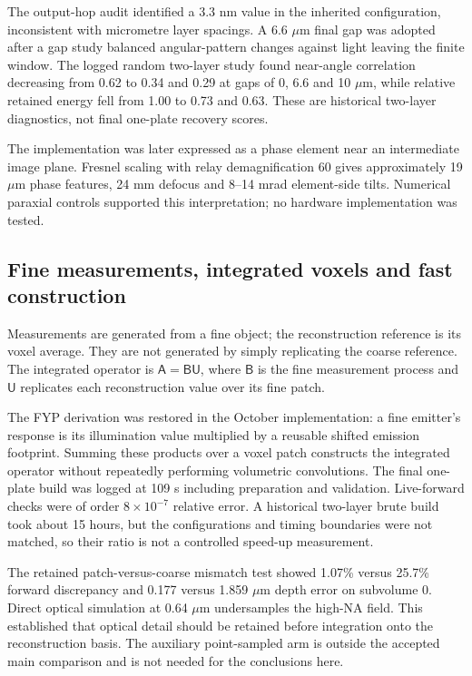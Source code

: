 The output-hop audit identified a 3.3 nm value in the inherited configuration, inconsistent with micrometre layer spacings. A 6.6 \ensuremath{\mu}m final gap was adopted after a gap study balanced angular-pattern changes against light leaving the finite window. The logged random two-layer study found near-angle correlation decreasing from 0.62 to 0.34 and 0.29 at gaps of 0, 6.6 and 10 \ensuremath{\mu}m, while relative retained energy fell from 1.00 to 0.73 and 0.63. These are historical two-layer diagnostics, not final one-plate recovery scores.

The implementation was later expressed as a phase element near an intermediate image plane. Fresnel scaling with relay demagnification 60 gives approximately 19 \ensuremath{\mu}m phase features, 24 mm defocus and 8--14 mrad element-side tilts. Numerical paraxial controls supported this interpretation; no hardware implementation was tested.

\subsection{Fine measurements, integrated voxels and fast construction}

Measurements are generated from a fine object; the reconstruction reference is its voxel average. They are not generated by simply replicating the coarse reference. The integrated operator is \(\mathsf A=\mathsf B\mathsf U\), where \(\mathsf B\) is the fine measurement process and \(\mathsf U\) replicates each reconstruction value over its fine patch.

The FYP derivation was restored in the October implementation: a fine emitter's response is its illumination value multiplied by a reusable shifted emission footprint. Summing these products over a voxel patch constructs the integrated operator without repeatedly performing volumetric convolutions. The final one-plate build was logged at 109 s including preparation and validation. Live-forward checks were of order \(8\times10^{-7}\) relative error. A historical two-layer brute build took about 15 hours, but the configurations and timing boundaries were not matched, so their ratio is not a controlled speed-up measurement.

The retained patch-versus-coarse mismatch test showed 1.07\% versus 25.7\% forward discrepancy and 0.177 versus 1.859 \ensuremath{\mu}m depth error on subvolume 0. Direct optical simulation at 0.64 \ensuremath{\mu}m undersamples the high-NA field. This established that optical detail should be retained before integration onto the reconstruction basis. The auxiliary point-sampled arm is outside the accepted main comparison and is not needed for the conclusions here.

